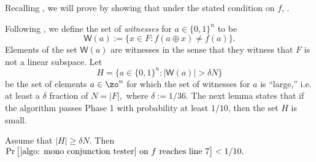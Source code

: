 \documentclass[11pt]{article}
\theoremstyle{definition}
\begin{document}
Recalling , we will prove  by showing that under the stated condition on $f$,
.






\def\W{\mathsf{W}}
Following \cite{PRS02},  we define the set of \emph{witnesses}  for $a \in \{0,1\}^n$ to be
$$
\W(a):=\big\{x \in F: f(a\oplus x ) \neq f(a)\big\}.
$$
Elements of the set $\W(a)$ are witnesses in the sense that they witness that $F$ is not a linear subspace. 
Let 
$$H = \big\{a \in \{0,1\}^n :  |\W(a) | > \delta N\big\}$$
be the set of elements $a \in \zo^n$ for which the set of witnesses for $a$ is ``large,'' i.e. at least a $\delta$ fraction of $N=|F|,$ where $\delta:=1/36$.
The next lemma states that if the algorithm passes Phase 1 with probability at least $1/10$, then the set $H$ is small. 


\begin{lemma} \label{lem: H big we reject}
    Assume that $|H| \geq \delta  N$. 
Then $\Pr\big[\text{\Cref{algo: mono conjunction tester} on $f$ reaches line 7}\big] < 1/10.$
\end{lemma}
\end{document}
